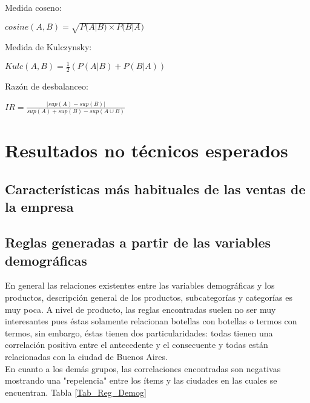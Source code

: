 \documentclass[]{article}
\begin{document}
Medida coseno:

\begin{center}
	$cosine(A,B) = \sqrt{P(A|B) \times P(B|A})$
\end{center}
	
Medida de Kulczynsky:
	
	\begin{center}
	$Kulc(A,B)= \frac{1}{2}\left(P(A|B) + P(B|A)\right)$	
\end{center}
		
Razón de desbalanceo:
		
\begin{center}
	$IR = \frac{|sup(A)- sup(B)|}{sup(A)+ sup(B)-sup(A \cup B)}$	
\end{center}

\section{Resultados no técnicos esperados}


\subsection{Características más habituales de las ventas de la empresa}


\subsection{Reglas generadas a partir de las variables demográficas}
En general las relaciones existentes entre las variables demográficas y los productos, descripción general de los productos, subcategorías y categorías es muy poca. A nivel de producto, las reglas encontradas suelen no ser muy interesantes pues éstas solamente relacionan botellas con botellas o termos con termos, sin embargo, éstas tienen dos particularidades: todas tienen una correlación positiva entre el antecedente y el consecuente y todas están relacionadas con la ciudad de Buenos Aires.\\

 En cuanto a los demás grupos, las correlaciones encontradas son negativas mostrando una "repelencia" entre los ítems y las ciudades en las cuales se encuentran. Tabla  \ref{Tab_Reg_Demog}
 
\end{document}
